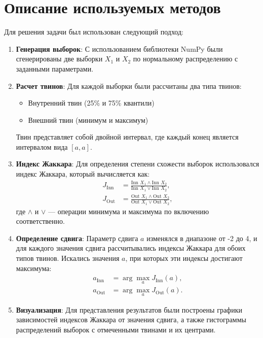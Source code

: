 \documentclass[a4paper]{article}
\begin{document}
    \section{Описание используемых методов}
    Для решения задачи был использован следующий подход:
    \begin{enumerate}
        \item \textbf{Генерация выборок}: С использованием библиотеки NumPy были сгенерированы две выборки \( X_1 \) и \( X_2 \) 
        по нормальному распределению с заданными параметрами.
        \item \textbf{Расчет твинов}: Для каждой выборки были рассчитаны два типа твинов:
        \begin{itemize}
            \item Внутренний твин (25\% и 75\% квантили)
            \item Внешний твин (минимум и максимум)
        \end{itemize}
        Твин представляет собой двойной интервал, где каждый конец является интервалом вида \([a,a]\).
        \item \textbf{Индекс Жаккара}: Для определения степени схожести выборок использовался индекс Жаккара, который вычисляется как:
        \[
        \begin{aligned}
        J_{\text{Inn}} & = \frac{\text{Inn } X_1 \wedge \text{Inn } X_2}{\text{Inn } X_1 \vee \text{Inn } X_2}, \\
        J_{\text{Out}} & = \frac{\text{Out } X_1 \wedge \text{Out } X_2}{\text{Out } X_1 \vee \text{Out } X_2},
        \end{aligned}
        \]
        где \(\wedge\) и \(\vee\) — операции минимума и максимума по включению соответственно.
        \item \textbf{Определение сдвига}: Параметр сдвига \( a \) изменялся в диапазоне от -2 до 4, и для каждого значения сдвига 
        рассчитывались индексы Жаккара для обоих типов твинов. Искались значения \( a \), при которых эти индексы 
        достигают максимума:
        \[
        \begin{aligned}
        a_{\text{Inn}} & = \arg\max_a J_{\text{Inn}}(a), \\
        a_{\text{Out}} & = \arg\max_a J_{\text{Out}}(a).
        \end{aligned}
        \]
        \item \textbf{Визуализация}: Для представления результатов были построены графики зависимостей индексов Жаккара от значения 
        сдвига, а также гистограммы распределений выборок с отмеченными твинами и их центрами.
    \end{enumerate}
\end{document}
